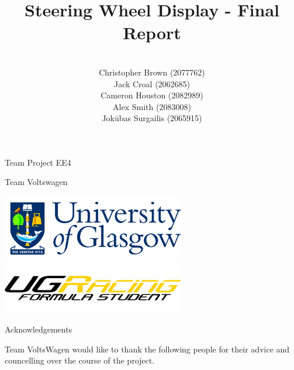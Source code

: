 \documentclass[a4paper,12pt]{article}
\author{\vspace{1cm} \\
        Christopher Brown (2077762) \\
        Jack Croal (2062685) \\
        Cameron Houston (2082989) \\
        Alex Smith (2083008) \\
        Jok\=ubas Surgailis (2065915) \\
}
\date{}
\title{\vspace{1.0cm}Steering Wheel Display - Final Report\vspace{1.0cm}}
\begin{document}
\maketitle

\thispagestyle{empty}

\begin{center}
\Large{Team Project EE4}
\end{center}

\begin{center}
\huge{Team Voltswagen}
\end{center}

\vspace{2.0cm}

\begin{center}
\includegraphics[width=8cm]{Figures/uni_logo.png}
\includegraphics[width=8cm]{Figures/ugr_logo_black.png}
\end{center}

\newpage
\clearpage
{}




\newpage
{\Huge Acknowledgements} \\

{\large

  \vspace{1.0cm}

  Team VoltsWagen would like to thank the following people for their advice and councelling over the course of the project. \\

  \vspace{1.0cm}


}
\end{document}
